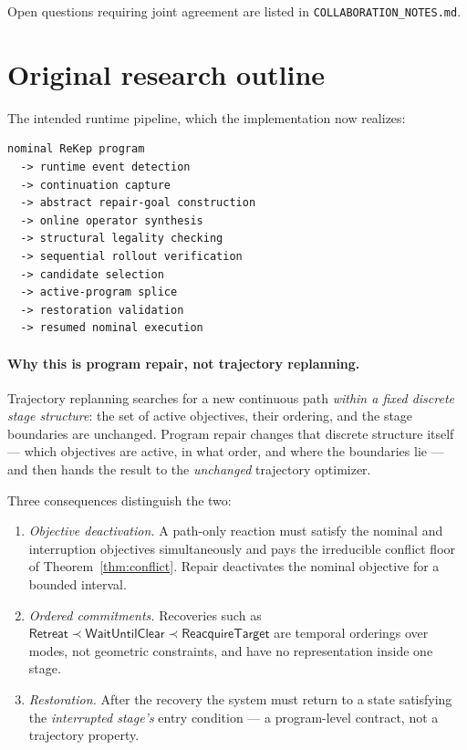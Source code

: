 \documentclass[11pt]{article}
\begin{document}
Open questions requiring joint agreement are listed in
\texttt{COLLABORATION\_NOTES.md}.

\section{Original research outline}

The intended runtime pipeline, which the implementation now realizes:

\begin{center}
\begin{minipage}{0.86\textwidth}
\begin{lstlisting}
nominal ReKep program
  -> runtime event detection
  -> continuation capture
  -> abstract repair-goal construction
  -> online operator synthesis
  -> structural legality checking
  -> sequential rollout verification
  -> candidate selection
  -> active-program splice
  -> restoration validation
  -> resumed nominal execution
\end{lstlisting}
\end{minipage}
\end{center}

\paragraph{Why this is program repair, not trajectory replanning.}
Trajectory replanning searches for a new continuous path \emph{within a fixed
discrete stage structure}: the set of active objectives, their ordering, and the
stage boundaries are unchanged. Program repair changes that discrete structure
itself --- which objectives are active, in what order, and where the boundaries
lie --- and then hands the result to the \emph{unchanged} trajectory optimizer.

Three consequences distinguish the two:
\begin{enumerate}[leftmargin=2em,itemsep=1pt]
  \item \emph{Objective deactivation.} A path-only reaction must satisfy the
        nominal and interruption objectives simultaneously and pays the
        irreducible conflict floor of Theorem~\ref{thm:conflict}. Repair
        deactivates the nominal objective for a bounded interval.
  \item \emph{Ordered commitments.} Recoveries such as
        $\textsf{Retreat}\prec\textsf{WaitUntilClear}\prec\textsf{ReacquireTarget}$
        are temporal orderings over modes, not geometric constraints, and have
        no representation inside one stage.
  \item \emph{Restoration.} After the recovery the system must return to a state
        satisfying the \emph{interrupted stage's} entry condition --- a program-level
        contract, not a trajectory property.
\end{enumerate}
\end{document}
